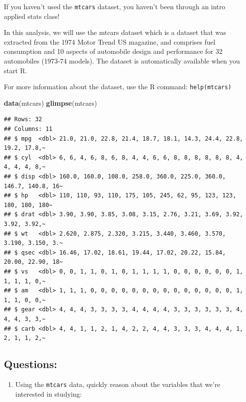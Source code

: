 \documentclass[
]{book}
\newenvironment{Shaded}{\begin{snugshade}}{\end{snugshade}}
\newcommand{\FunctionTok}[1]{\textcolor[rgb]{0.13,0.29,0.53}{\textbf{#1}}}
\newcommand{\NormalTok}[1]{#1}
\providecommand{\tightlist}{%
  \setlength{\itemsep}{0pt}\setlength{\parskip}{0pt}}
\theoremstyle{definition}
\theoremstyle{definition}
\theoremstyle{definition}
\theoremstyle{definition}
\theoremstyle{remark}
\begin{document}
If you haven't used the \texttt{mtcars} dataset, you haven't been through an intro applied stats class!

In this analysis, we will use the mtcars dataset which is a dataset that was extracted from the 1974 Motor Trend US magazine, and comprises fuel consumption and 10 aspects of automobile design and performance for 32 automobiles (1973-74 models). The dataset is automatically available when you start R.

For more information about the dataset, use the R command: \texttt{help(mtcars)}

\begin{Shaded}
\begin{Highlighting}[]
\FunctionTok{data}\NormalTok{(mtcars)}
\FunctionTok{glimpse}\NormalTok{(mtcars)}
\end{Highlighting}
\end{Shaded}

\begin{verbatim}
## Rows: 32
## Columns: 11
## $ mpg  <dbl> 21.0, 21.0, 22.8, 21.4, 18.7, 18.1, 14.3, 24.4, 22.8, 19.2, 17.8,~
## $ cyl  <dbl> 6, 6, 4, 6, 8, 6, 8, 4, 4, 6, 6, 8, 8, 8, 8, 8, 8, 4, 4, 4, 4, 8,~
## $ disp <dbl> 160.0, 160.0, 108.0, 258.0, 360.0, 225.0, 360.0, 146.7, 140.8, 16~
## $ hp   <dbl> 110, 110, 93, 110, 175, 105, 245, 62, 95, 123, 123, 180, 180, 180~
## $ drat <dbl> 3.90, 3.90, 3.85, 3.08, 3.15, 2.76, 3.21, 3.69, 3.92, 3.92, 3.92,~
## $ wt   <dbl> 2.620, 2.875, 2.320, 3.215, 3.440, 3.460, 3.570, 3.190, 3.150, 3.~
## $ qsec <dbl> 16.46, 17.02, 18.61, 19.44, 17.02, 20.22, 15.84, 20.00, 22.90, 18~
## $ vs   <dbl> 0, 0, 1, 1, 0, 1, 0, 1, 1, 1, 1, 0, 0, 0, 0, 0, 0, 1, 1, 1, 1, 0,~
## $ am   <dbl> 1, 1, 1, 0, 0, 0, 0, 0, 0, 0, 0, 0, 0, 0, 0, 0, 0, 1, 1, 1, 0, 0,~
## $ gear <dbl> 4, 4, 4, 3, 3, 3, 3, 4, 4, 4, 4, 3, 3, 3, 3, 3, 3, 4, 4, 4, 3, 3,~
## $ carb <dbl> 4, 4, 1, 1, 2, 1, 4, 2, 2, 4, 4, 3, 3, 3, 4, 4, 4, 1, 2, 1, 1, 2,~
\end{verbatim}

\subsection{Questions:}\label{questions-1}

\begin{enumerate}
\def\labelenumi{\arabic{enumi}.}
\setcounter{enumi}{-1}
\tightlist
\item
  Using the \texttt{mtcars} data, quickly reason about the variables that we're interested in studying:
\end{enumerate}
\end{document}
